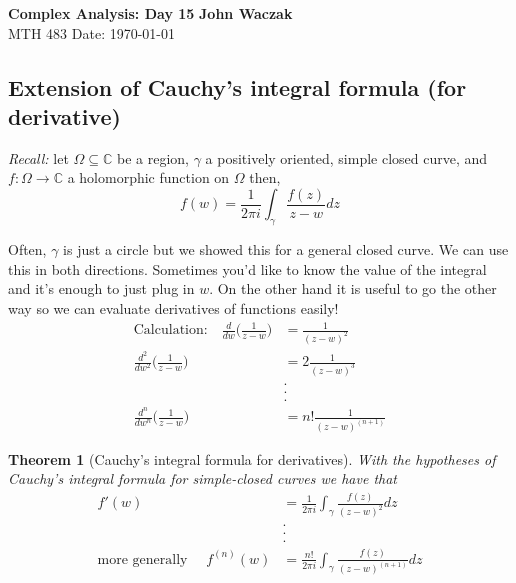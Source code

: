 \documentclass[a4paper, 11pt]{article}
\newtheorem*{theorem}{Theorem}
\begin{document}
\noindent
\large\textbf{Complex Analysis: Day 15} \hfill \textbf{John Waczak} \\
\normalsize MTH 483 \hfill  Date: \today \\


\subsection*{Extension of Cauchy's integral formula (for derivative)}
	\textit{Recall:} let $\Omega\subseteq\mathbb{C}$ be a region, $\gamma$ a positively oriented, simple closed curve, and $f:\Omega\rightarrow\mathbb{C}$ a holomorphic function on $\Omega$ then,
		\begin{equation*}
			f(w) = \frac{1}{2\pi i}\int_\gamma \frac{f(z)}{z-w}dz
		\end{equation*}
		
	\noindent Often, $\gamma$ is just a circle but we showed this for a general closed curve. We can use this in both directions. Sometimes you'd like to know the value of the integral and it's enough to just plug in $w$. On the other hand it is useful to go the other way so we can evaluate derivatives of functions easily!
		\begin{align*}
			\text{Calculation:} \quad \frac{d}{dw}\Big(\frac{1}{z-w}\Big) &= \frac{1}{(z-w)^2} \\ 
				\frac{d^2}{dw^2}\Big(\frac{1}{z-w}\Big) &= 2\frac{1}{(z-w)^3} \\ 
					&. \\ 
					&. \\ 
					&. \\ 
				\frac{d^n}{dw^n}\Big(\frac{1}{z-w}\Big) &= n!\frac{1}{(z-w)^(n+1)}
		\end{align*}
	\begin{theorem}[Cauchy's integral formula for derivatives]
		With the hypotheses of Cauchy's integral formula for simple-closed curves we have that
			\begin{align*}
				f'(w) &= \frac{1}{2\pi i}\int_\gamma \frac{f(z)}{(z-w)^2} dz \\
					&. \\ 
					&. \\ 
					&. \\
				\text{more generally }\quad f^{(n)}(w) &= \frac{n!}{2\pi i}\int_\gamma \frac{f(z)}{(z-w)^(n+1)}dz
			\end{align*}
	\end{theorem}
		
\end{document}
